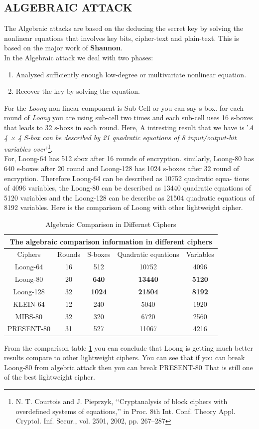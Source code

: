 \documentclass[preprint]{transcrypto}
\begin{document}
\subsection{ALGEBRAIC ATTACK}
The Algebraic attacks are based on the deducing the secret key by solving the nonlinear equations that involves key bits, cipher-text and  plain-text. This is based on the major work of \textbf{Shannon}.\\
In the Algebraic attack we deal with two phases:
\begin{enumerate}
    \item Analyzed sufficiently enough low-degree or multivariate nonlinear equation.
    \item Recover the key by solving the equation.
\end{enumerate}
For the \textit{Loong} non-linear component is Sub-Cell or you can say s-box. for each round of \textit{Loong} you are using sub-cell two times and each sub-cell uses 16 s-boxes that leads to 32 s-boxs in each round. Here, A intresting result that we have is '\textit{A 4 × 4 S-box can be described by 21 quadratic equations of 8 input/output-bit variables over}'\footnote{N. T. Courtois and J. Pieprzyk, ‘‘Cryptanalysis of block ciphers with
overdefined systems of equations,’’ in Proc. 8th Int. Conf. Theory Appl.
Cryptol. Inf. Secur., vol. 2501, 2002, pp. 267–287}.\\
For, Loong-64 has 512 sbox after 16 rounds of encryption. similarly, Loong-80 has 640 s-boxes after 20 round and Loong-128 has 1024 s-boxes after 32 round of encryption. Therefore Loong-64 can be described as 10752 quadratic equa-
tions of 4096 variables, the Loong-80 can be described as 13440 quadratic equations of 5120 variables and the Loong-128 can be describe as 21504 quadratic equations of 8192 variables. Here is the comparison of Loong with other lightweight cipher. \\
\begin{table}[h!]
\centering
\begin{tabular}{ |c|c|c|c|c|  }
\hline
\multicolumn{5}{|c|}{The algebraic comparison information in different ciphers} \\
\hline
Ciphers &Rounds &S-boxes &Quadratic equations &Variables\\
\hline
Loong-64 &16 &512 &10752    &4096\\
Loong-80 &20 &\textbf{640} &\textbf{13440} &\textbf{5120}\\
Loong-128 &32 &\textbf{1024} &\textbf{21504} &\textbf{8192}\\
KLEIN-64 &12 &240 &5040 &1920\\
MIBS-80 &32 &320 &6720 &2560\\
PRESENT-80 &31 &527 &11067 &4216\\
\hline
\end{tabular}
\caption{Algebraic Comparison in Differnet Ciphers}
\label{table:algebra}
\end{table}
From the comparison table \ref{table:algebra} you can conclude that Loong is getting much better results compare to other lightweight ciphers. You can see that if you can break Loong-80 from algebric attack then you can break PRESENT-80 That is still one of the best lightweight cipher.\\
\end{document}
